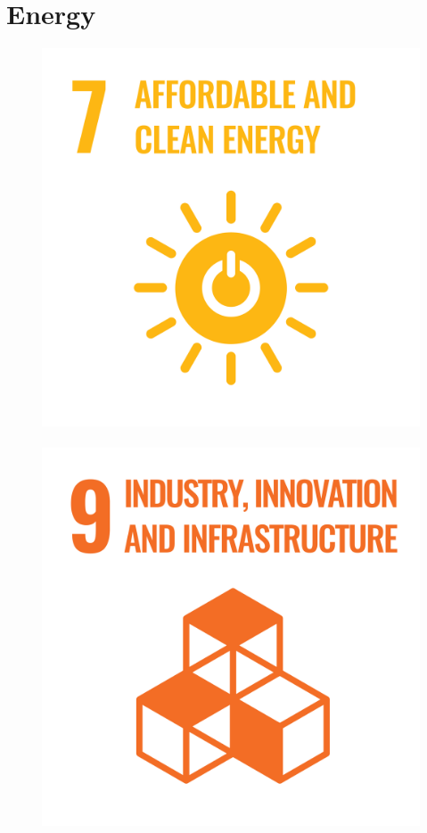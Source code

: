 \documentclass[../SustainableHEP.tex]{subfiles}
\begin{document}
\RaggedRight
\sloppy

\newpage
\section{Energy}
\label{sec:Energy}

\exSum


\begin{figure}
\includegraphics[width=\SDGsize]{Sections/Figs/Common/SDG_7_CleanEnergy.png}~%
\includegraphics[width=\SDGsize]{Sections/Figs/Common/SDG_9_IndustryInnovation.png}~%

\end{figure}
\end{document}
